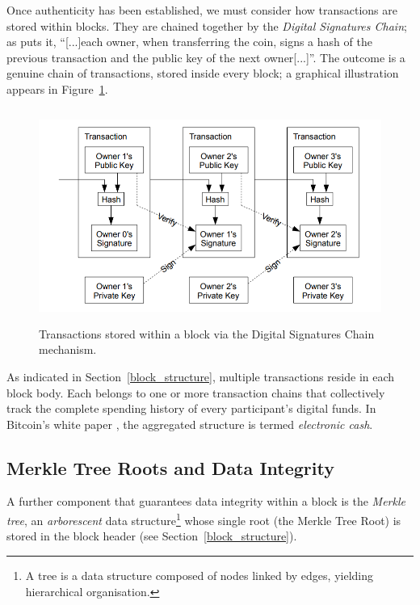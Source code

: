 Once authenticity has been established, we must consider how transactions are stored within blocks. They are chained together by the \textit{Digital Signatures Chain}; as \cite{bitcoin} puts it, “[...]each owner, when transferring the coin, signs a hash of the previous transaction and the public key of the next owner[...]”. The outcome is a genuine chain of transactions, stored inside every block; a graphical illustration appears in Figure~\ref{transaction_chain}.
\begin{figure}[h]
    \centering
    \includegraphics[width=12cm,height=7cm]{Images/Chap1/Transaction_Chain.png}
    \caption[Transaction Chain]{Transactions stored within a block via the Digital Signatures Chain mechanism.}
    \label{transaction_chain}
\end{figure}
As indicated in Section~\ref{block_structure}, multiple transactions reside in each block body. Each belongs to one or more transaction chains that collectively track the complete spending history of every participant's digital funds. In Bitcoin's white paper \cite{bitcoin}, the aggregated structure is termed \textit{electronic cash}.

\subsection{Merkle Tree Roots and Data Integrity}\label{Merkle_Tree}
A further component that guarantees data integrity within a block is the \textit{Merkle tree}, an \textit{arborescent} data structure\footnote{A tree is a data structure composed of nodes linked by edges, yielding hierarchical organisation.} whose single root (the Merkle Tree Root) is stored in the block header (see Section~\ref{block_structure}).


